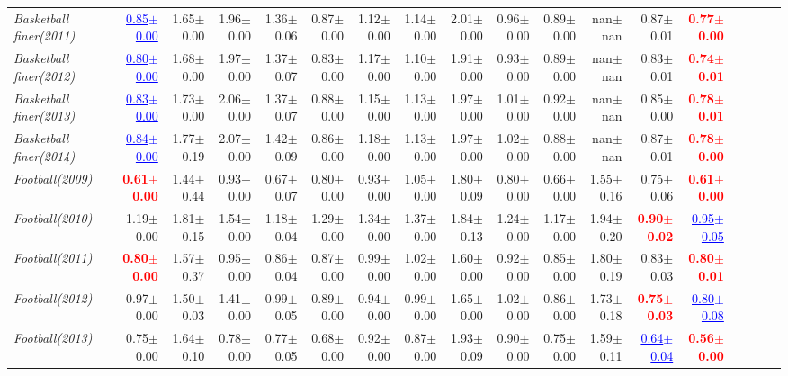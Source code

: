 \documentclass[nohyperref]{article}
\theoremstyle{plain}
\theoremstyle{definition}
\theoremstyle{remark}
\newcommand{\red}[1]{\textcolor{red}{\textbf{#1}}}
\newcommand{\blue}[1]{\textcolor{blue}{\underline{#1}}}
\begin{document}
\begin{table*}[!ht]
{\begin{tabular}{lrrrrrrrrrrrrrrrrr}
			{\it Basketball finer(2011)} & \blue{0.85$\pm$0.00} & 1.65$\pm$0.00 & 1.96$\pm$0.00 & 1.36$\pm$0.06 & 0.87$\pm$0.00 & 1.12$\pm$0.00 & 1.14$\pm$0.00 & 2.01$\pm$0.00 & 0.96$\pm$0.00 & 0.89$\pm$0.00 & nan$\pm$nan & 0.87$\pm$0.01 & \red{0.77$\pm$0.00} \\
			{\it Basketball finer(2012)} & \blue{0.80$\pm$0.00} & 1.68$\pm$0.00 & 1.97$\pm$0.00 & 1.37$\pm$0.07 & 0.83$\pm$0.00 & 1.17$\pm$0.00 & 1.10$\pm$0.00 & 1.91$\pm$0.00 & 0.93$\pm$0.00 & 0.89$\pm$0.00 & nan$\pm$nan & 0.83$\pm$0.01 & \red{0.74$\pm$0.01} \\
			{\it Basketball finer(2013)} & \blue{0.83$\pm$0.00} & 1.73$\pm$0.00 & 2.06$\pm$0.00 & 1.37$\pm$0.07 & 0.88$\pm$0.00 & 1.15$\pm$0.00 & 1.13$\pm$0.00 & 1.97$\pm$0.00 & 1.01$\pm$0.00 & 0.92$\pm$0.00 & nan$\pm$nan & 0.85$\pm$0.00 & \red{0.78$\pm$0.01} \\
			{\it Basketball finer(2014)} & \blue{0.84$\pm$0.00} & 1.77$\pm$0.19 & 2.07$\pm$0.00 & 1.42$\pm$0.09 & 0.86$\pm$0.00 & 1.18$\pm$0.00 & 1.13$\pm$0.00 & 1.97$\pm$0.00 & 1.02$\pm$0.00 & 0.88$\pm$0.00 & nan$\pm$nan & 0.87$\pm$0.01 & \red{0.78$\pm$0.00} \\
			{\it Football(2009)} & \red{0.61$\pm$0.00} & 1.44$\pm$0.44 & 0.93$\pm$0.00 & 0.67$\pm$0.07 & 0.80$\pm$0.00 & 0.93$\pm$0.00 & 1.05$\pm$0.00 & 1.80$\pm$0.09 & 0.80$\pm$0.00 & 0.66$\pm$0.00 & 1.55$\pm$0.16 & 0.75$\pm$0.06 & \red{0.61$\pm$0.00} \\
			{\it Football(2010)} & 1.19$\pm$0.00 & 1.81$\pm$0.15 & 1.54$\pm$0.00 & 1.18$\pm$0.04 & 1.29$\pm$0.00 & 1.34$\pm$0.00 & 1.37$\pm$0.00 & 1.84$\pm$0.13 & 1.24$\pm$0.00 & 1.17$\pm$0.00 & 1.94$\pm$0.20 & \red{0.90$\pm$0.02} & \blue{0.95$\pm$0.05} \\
			{\it Football(2011)} & \red{0.80$\pm$0.00} & 1.57$\pm$0.37 & 0.95$\pm$0.00 & 0.86$\pm$0.04 & 0.87$\pm$0.00 & 0.99$\pm$0.00 & 1.02$\pm$0.00 & 1.60$\pm$0.00 & 0.92$\pm$0.00 & 0.85$\pm$0.00 & 1.80$\pm$0.19 & 0.83$\pm$0.03 & \red{0.80$\pm$0.01} \\
			{\it Football(2012)} & 0.97$\pm$0.00 & 1.50$\pm$0.03 & 1.41$\pm$0.00 & 0.99$\pm$0.05 & 0.89$\pm$0.00 & 0.94$\pm$0.00 & 0.99$\pm$0.00 & 1.65$\pm$0.00 & 1.02$\pm$0.00 & 0.86$\pm$0.00 & 1.73$\pm$0.18 & \red{0.75$\pm$0.03} & \blue{0.80$\pm$0.08} \\
			{\it Football(2013)} & 0.75$\pm$0.00 & 1.64$\pm$0.10 & 0.78$\pm$0.00 & 0.77$\pm$0.05 & 0.68$\pm$0.00 & 0.92$\pm$0.00 & 0.87$\pm$0.00 & 1.93$\pm$0.09 & 0.90$\pm$0.00 & 0.75$\pm$0.00 & 1.59$\pm$0.11 & \blue{0.64$\pm$0.04} & \red{0.56$\pm$0.00} \\

\end{tabular}}
\end{table*}
\end{document}
